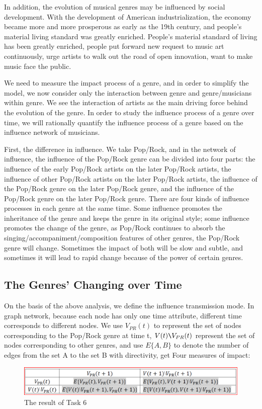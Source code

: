 \documentclass[conference]{IEEEtran}
\begin{document}
In addition, the evolution of musical genres may be influenced by social development. With the development of American industrialization, the economy became more and more prosperous as early as the 19th century, and people’s material living standard was greatly enriched. People’s material standard of living has been greatly enriched, people put forward new request to music art continuously, urge artists to walk out the road of open innovation, want to make music face the public.

We need to measure the impact process of a genre, and in order to simplify the model, we now consider only the interaction between genre and genre/musicians within genre. We see the interaction of artists as the main driving force behind the evolution of the genre. In order to study the influence process of a genre over time, we will rationally quantify the influence process of a genre based on the influence network of musicians.

First, the difference in influence. We take Pop/Rock, and in the network of influence, the influence of the Pop/Rock genre can be divided into four parts: the influence of the early Pop/Rock artists on the later Pop/Rock artists, the influence of other Pop/Rock artists on the later Pop/Rock artists, the influence of the Pop/Rock genre on the later Pop/Rock genre, and the influence of the Pop/Rock genre on the later Pop/Rock genre. There are four kinds of influence processes in each genre at the same time. Some influence promotes the inheritance of the genre and keeps the genre in its original style; some influence promotes the change of the genre, as Pop/Rock continues to absorb the singing/accompaniment/composition features of other genres, the Pop/Rock genre will change. Sometimes the impact of both will be slow and subtle, and sometimes it will lead to rapid change because of the power of certain genres.

\subsection{The Genres' Changing over Time}
On the basis of the above analysis, we define the influence transmission mode. In graph network, because each node has only one time attribute, different time corresponds to different nodes. We use $V_{PR}(t)$ to represent the set of nodes corresponding to the Pop/Rock genre at time t, $V(t) \verb|\| V_{PR}(t)$ represent the set of nodes corresponding to other genres, and use $ E\{A,B\}$ to denote the number of edges from the set A to the set B with directivity, get Four measures of impact:
\begin{figure}[!htbp]
	\centering
	\includegraphics[width=.3\textwidth]{./img/task6}
	\caption{The result of Task 6}\label{fig:task6}
\end{figure}
\end{document}
